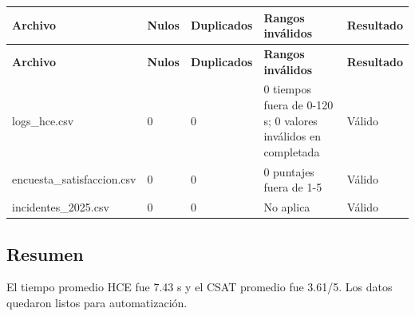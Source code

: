 \documentclass[11pt]{article}
\begin{document}
\small
\begin{longtable}{p{} p{} p{} p{} p{}}
\toprule
\textbf{Archivo} & \textbf{Nulos} & \textbf{Duplicados} & \textbf{Rangos inválidos} & \textbf{Resultado} \\
\midrule
\endfirsthead
\toprule
\textbf{Archivo} & \textbf{Nulos} & \textbf{Duplicados} & \textbf{Rangos inválidos} & \textbf{Resultado} \\
\midrule
\endhead
logs\_hce.csv & 0 & 0 & 0 tiempos fuera de 0-120 s; 0 valores inválidos en completada & Válido \\
encuesta\_satisfaccion.csv & 0 & 0 & 0 puntajes fuera de 1-5 & Válido \\
incidentes\_2025.csv & 0 & 0 & No aplica & Válido \\
\bottomrule
\end{longtable}
\normalsize

\subsection*{Resumen}
El tiempo promedio HCE fue 7.43 s y el CSAT promedio fue 3.61/5. Los datos quedaron listos para automatización.
\end{document}

